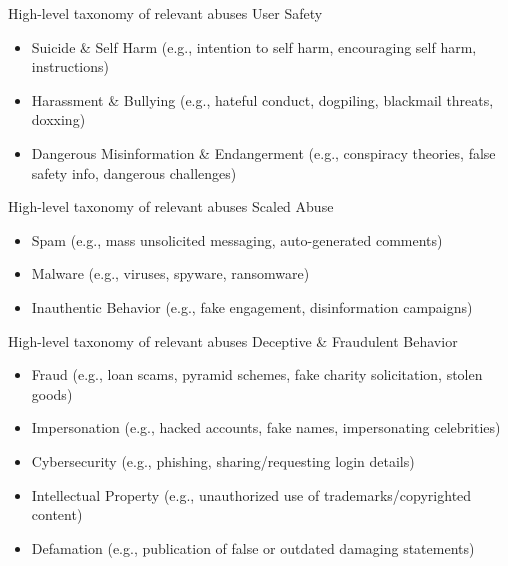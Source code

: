 \documentclass[nobackground,dvipsnames,table]{beamer}
\begin{document}
\begin{frame}{High-level taxonomy of relevant abuses}
	User Safety
	\begin{itemize}
		\item Suicide \& Self Harm (e.g., intention to self harm, encouraging self harm, instructions)
		\item Harassment \& Bullying (e.g., hateful conduct, dogpiling, blackmail threats, doxxing)
		\item Dangerous Misinformation \& Endangerment (e.g., conspiracy theories, false safety info, dangerous challenges)
	\end{itemize}
\end{frame}

\begin{frame}{High-level taxonomy of relevant abuses}
	Scaled Abuse
	\begin{itemize}
		\item Spam (e.g., mass unsolicited messaging, auto-generated comments)
		\item Malware (e.g., viruses, spyware, ransomware)
		\item Inauthentic Behavior (e.g., fake engagement, disinformation campaigns)
	\end{itemize}
\end{frame}

\begin{frame}{High-level taxonomy of relevant abuses}
	Deceptive \& Fraudulent Behavior
	\begin{itemize}
		\item Fraud (e.g., loan scams, pyramid schemes, fake charity solicitation, stolen goods)
		\item Impersonation (e.g., hacked accounts, fake names, impersonating celebrities)
		\item Cybersecurity (e.g., phishing, sharing/requesting login details)
		\item Intellectual Property (e.g., unauthorized use of trademarks/copyrighted content)
		\item Defamation (e.g., publication of false or outdated damaging statements)
	\end{itemize}
\end{frame}
\end{document}
